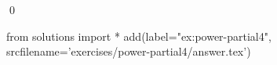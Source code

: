 
\begin{ex} 
  \label{ex:power-partial4}
  
  \qed
\end{ex} 
\begin{python0}
from solutions import *
add(label="ex:power-partial4",
    srcfilename='exercises/power-partial4/answer.tex') 
\end{python0}

